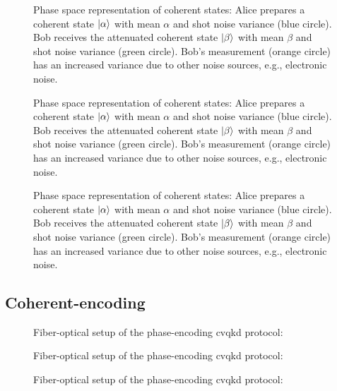 \begin{figure}[htb]
	\centering
	
	\caption{Phase space representation of coherent states: Alice prepares a coherent state $\ket{\alpha}$ with mean $\alpha$ and shot noise variance (blue circle). Bob receives the attenuated coherent state $\ket{\beta}$ with mean $\beta$ and shot noise variance (green circle). Bob's measurement (orange circle) has an increased variance due to other noise sources, e.g., electronic noise.}
\end{figure}

\begin{figure}[htb]
	\centering
	
	\caption{Phase space representation of coherent states: Alice prepares a coherent state $\ket{\alpha}$ with mean $\alpha$ and shot noise variance (blue circle). Bob receives the attenuated coherent state $\ket{\beta}$ with mean $\beta$ and shot noise variance (green circle). Bob's measurement (orange circle) has an increased variance due to other noise sources, e.g., electronic noise.}
\end{figure}

\begin{figure}[htb]
	\centering
	
	\caption{Phase space representation of coherent states: Alice prepares a coherent state $\ket{\alpha}$ with mean $\alpha$ and shot noise variance (blue circle). Bob receives the attenuated coherent state $\ket{\beta}$ with mean $\beta$ and shot noise variance (green circle). Bob's measurement (orange circle) has an increased variance due to other noise sources, e.g., electronic noise.}
\end{figure}


\subsection{Coherent-encoding}

\begin{figure}[htb]
	\centering
	
	\caption{Fiber-optical setup of the phase-encoding \gls{cvqkd} protocol:}
\end{figure}

\begin{figure}[htb]
	\centering
	
	\caption{Fiber-optical setup of the phase-encoding \gls{cvqkd} protocol:}
\end{figure}

\begin{figure}[htb]
	\centering
	
	\caption{Fiber-optical setup of the phase-encoding \gls{cvqkd} protocol:}
\end{figure}

